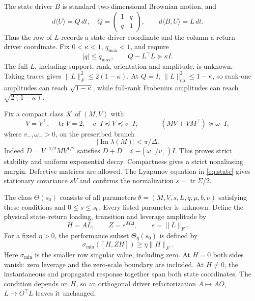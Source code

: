 \documentclass[11pt,a4paper]{amsart}
\theoremstyle{plain}
\theoremstyle{definition}
\theoremstyle{remark}
\DeclareMathOperator{\tr}{tr}
\begin{document}
The state driver $B$ is standard two-dimensional Brownian motion, and
\begin{equation}\label{eq:brownian}
 d\langle U\rangle=Q\,dt,\quad
 Q=\begin{pmatrix}1&q\\q&1\end{pmatrix},\qquad
 d\langle B,U\rangle=L\,dt.
\end{equation}
Thus the row of $L$ records a state-driver coordinate and the column a
return-driver coordinate. Fix $0<\kappa<1$, $q_{\max}<1$, and require
\begin{equation}\label{eq:residual}
 |q|\le q_{\max},\qquad Q-L^\top L\succeq\kappa I.
\end{equation}
The full $L$, including support, rank, orientation and amplitude, is
unknown. Taking traces gives $\|L\|_F^2\le2(1-\kappa)$. At $Q=I$,
$\|L\|_{\mathrm{op}}^2\le1-\kappa$, so rank-one amplitudes can reach
$\sqrt{1-\kappa}$, while full-rank Frobenius amplitudes can reach
$\sqrt{2(1-\kappa)}$.

Fix a compact class $\mathcal K$ of $(M,V)$ with
\begin{equation}\label{eq:class}
 V=V^\top,\quad \tr V=2,\quad v_-I\preceq V\preceq v_+I,
 \qquad -(MV+VM^\top)\succeq\omega_- I,
\end{equation}
where $v_-,\omega_->0$, on the prescribed branch
\begin{equation}\label{eq:strip}
 |\operatorname{Im}\lambda(M)|<\pi/\Delta.
\end{equation}
Indeed $D=V^{-1/2}MV^{1/2}$ satisfies
$D+D^\top\preceq-(\omega_-/v_+)I$. This proves strict stability and
uniform exponential decay. Compactness gives a strict nonaliasing margin.
Defective matrices are allowed. The Lyapunov equation in
\eqref{eq:state} gives stationary covariance $sV$ and confirms the
normalization $s=\tr\Sigma/2$.

The class $\Theta(s_0)$ consists of all parameters
$\theta=(M,V,s,L,q,\mu,b,\nu)$ satisfying these conditions and
$0\le s\le s_0$. Every listed parameter is unknown. Define the physical
state--return loading, transition and leverage amplitude by
\begin{equation}\label{eq:HZ}
 H=AL,\qquad Z=e^{M\Delta},\qquad e=\|L\|_F.
\end{equation}
For a fixed $\eta>0$, the performance subset $\Theta_\eta(s_0)$ is defined
by
\begin{equation}\label{eq:excitation}
 \sigma_{\min}([H,ZH])\ge\eta\|H\|_F.
\end{equation}
Here $\sigma_{\min}$ is the smaller row singular value, including zero.
At $H=0$ both sides vanish: zero leverage and the zero-scale boundary are
included. At $H\ne0$, the instantaneous and propagated response together
span both state coordinates. The condition depends on $H$, so an orthogonal
driver refactorization
$A\mapsto AO$, $L\mapsto O^\top L$ leaves it unchanged.
\end{document}
